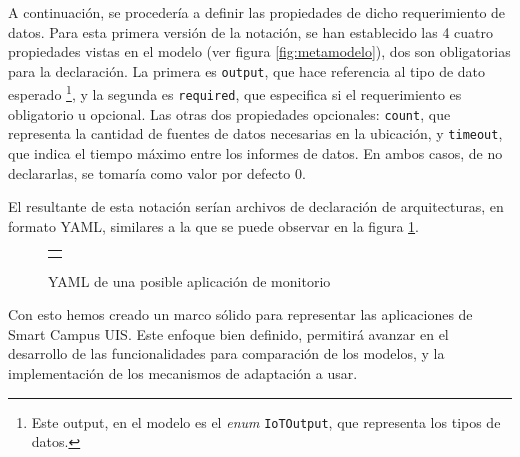 A continuación, se procedería a definir las propiedades de dicho requerimiento de datos. Para esta primera versión de la notación, se han establecido las 4 cuatro propiedades vistas en el modelo (ver figura \ref{fig:metamodelo}), dos son obligatorias para la declaración. La primera es \texttt{output}, que hace referencia al tipo de dato esperado \footnote{Este output, en el modelo es el \textit{enum} \texttt{IoTOutput}, que representa los tipos de datos.}, y la segunda es \texttt{required}, que especifica si el requerimiento es obligatorio u opcional. Las otras dos propiedades opcionales: \texttt{count}, que representa la cantidad de fuentes de datos necesarias en la ubicación, y \texttt{timeout}, que indica el tiempo máximo entre los informes de datos. En ambos casos, de no declararlas, se tomaría como valor por defecto 0.

El resultante de esta notación serían archivos de declaración de arquitecturas, en formato YAML, similares a la que se puede observar en la figura \ref{fig:YAML-ADL}.

\begin{figure}[ht]
    \centering
    \caption{YAML de una posible aplicación de monitorio}
    \label{fig:YAML-ADL}
    \begin{tabular}{c}
        \setstretch{1}
        \small
        
    \end{tabular}
\end{figure}

Con esto hemos creado un marco sólido para representar las aplicaciones de Smart Campus UIS. Este enfoque bien definido, permitirá avanzar en el desarrollo de las funcionalidades para comparación de los modelos, y la implementación de los mecanismos de adaptación a usar. 